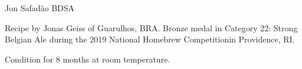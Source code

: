 \begin{recipe}{Jon Safadão BDSA}

\begin{aboutblock}
Recipe by Jonas Geiss of Guarulhos, BRA. Bronze medal in Category 22: Strong
Belgian Ale during the 2019 National Homebrew Competitionin Providence, RI.
\sourceaha
\end{aboutblock}


\begin{methodandtiming}
 
\begin{mashsteps}
\end{mashsteps}

\begin{fermentationsteps}
\end{fermentationsteps}

\begin{directions}
Condition for 8 months at room temperature.
\end{directions}

\end{methodandtiming}

\recipebreak

\begin{ingredientsblock}

\begin{malts}
\end{malts}

\begin{hops}
\end{hops}


\end{ingredientsblock}

\end{recipe}

